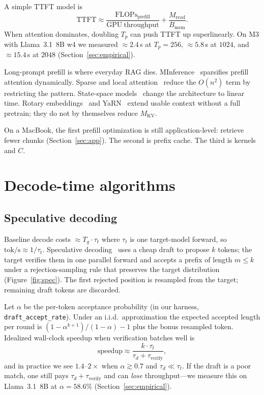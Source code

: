 A simple TTFT model is
\begin{equation}
  \mathrm{TTFT} \approx \frac{\mathrm{FLOPs}_{\mathrm{prefill}}}{\mathrm{GPU\ throughput}} + \frac{M_{\mathrm{read}}}{B_{\mathrm{mem}}}.
\end{equation}
When attention dominates, doubling \(T_p\) can push TTFT up superlinearly. On M3 with Llama~3.1~8B w4 we measured \(\approx 2.4\)\,s at \(T_p=256\), \(\approx 5.8\)\,s at \(1024\), and \(\approx 15.4\)\,s at \(2048\) (Section~\ref{sec:empirical}).

Long-prompt prefill is where everyday RAG dies. MInference~\citep{jiang2024minference} sparsifies prefill attention dynamically. Sparse and local attention~\citep{child2019sparse,beltagy2020longformer} reduce the \(O(n^2)\) term by restricting the pattern. State-space models~\citep{gu2023mamba} change the architecture to linear time. Rotary embeddings~\citep{su2024rope} and YaRN~\citep{peng2023yarn} extend usable context without a full pretrain; they do not by themselves reduce \(M_{\mathrm{KV}}\).

On a MacBook, the first prefill optimization is still application-level: retrieve fewer chunks (Section~\ref{sec:app}). The second is prefix cache. The third is kernels and \(C\).

\section{Decode-time algorithms}
\label{sec:decode}

\subsection{Speculative decoding}

Baseline decode costs \(\approx T_g \cdot \tau_t\) where \(\tau_t\) is one target-model forward, so \(\mathrm{tok/s} \approx 1/\tau_t\). Speculative decoding~\citep{leviathan2023speculative,chen2023speculative} uses a cheap draft to propose \(k\) tokens; the target verifies them in one parallel forward and accepts a prefix of length \(m \le k\) under a rejection-sampling rule that preserves the target distribution (Figure~\ref{fig:spec}). The first rejected position is resampled from the target; remaining draft tokens are discarded.

Let \(\alpha\) be the per-token acceptance probability (in our harness, \texttt{draft\_accept\_rate}). Under an i.i.d.\ approximation the expected accepted length per round is \((1-\alpha^{k+1})/(1-\alpha)-1\) plus the bonus resampled token. Idealized wall-clock speedup when verification batches well is
\begin{equation}
  \mathrm{speedup} \approx \frac{k\cdot \tau_t}{\tau_d + \tau_{\mathrm{verify}}},
\end{equation}
and in practice we see \(1.4\)--\(2\times\) when \(\alpha \gtrsim 0.7\) and \(\tau_d \ll \tau_t\). If the draft is a poor match, one still pays \(\tau_d + \tau_{\mathrm{verify}}\) and can \emph{lose} throughput---we measure this on Llama~3.1~8B at \(\alpha=58.6\%\) (Section~\ref{sec:empirical}).

